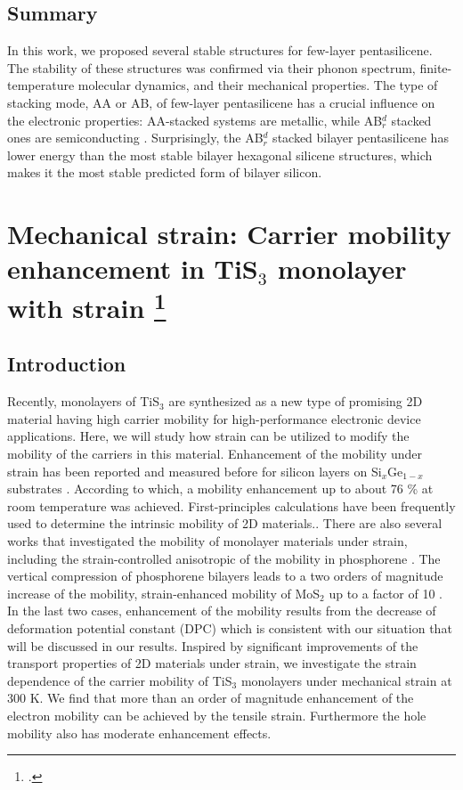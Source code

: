 \subsection{Summary}

In this work, we proposed several stable structures for few-layer pentasilicene. The stability of these structures was confirmed via their phonon spectrum, finite-temperature molecular dynamics, and their mechanical properties. The type of stacking mode, AA or AB, of few-layer pentasilicene has a crucial influence on the electronic properties: AA-stacked systems are metallic, while AB$_r^d$ stacked ones are semiconducting . Surprisingly, the AB$_r^d$ stacked bilayer pentasilicene has lower energy than the most stable bilayer hexagonal silicene structures, which makes it the most stable predicted form of bilayer silicon.  

\section[Mechanical strain: Carrier mobility enhancement in TiS$_3$ monolayer with strain]{Mechanical strain: Carrier mobility enhancement in TiS$_3$ monolayer with strain \footcite[This work is published:][]{Aierken2016.mobility} \label{mob_Tis3}}

\subsection{Introduction}

Recently, monolayers of TiS$_3$\cite{ADOM:ADOM201400043,ADMA:ADMA201405632} are synthesized as a new type of promising 2D material having high carrier mobility for high-performance electronic device applications. Here, we will study how strain can be utilized to modify the mobility of the carriers in this material. Enhancement of the mobility under strain has been reported and measured before for silicon layers on Si$_x$Ge$_{1-x}$ substrates \cite{Vogelsang1993,Welser1994}. According to which, a mobility enhancement up to about 76 \% at room temperature was achieved. First-principles calculations have been frequently used to determine the intrinsic mobility of 2D materials.\cite{Kaasbjerg2012,Zhang2014,Yongqing2014}. There are also several works that investigated the mobility of monolayer materials under strain\cite{fei,Henry2015,Sheng2015}, including the strain-controlled anisotropic of the mobility in phosphorene \cite{fei}. The vertical compression of phosphorene bilayers leads to a two orders of magnitude increase of the mobility\cite{Henry2015}, strain-enhanced mobility of MoS$_2$ up to a factor of 10 \cite{Sheng2015}. In the last two cases, enhancement of the mobility results from the decrease of deformation potential constant (DPC) which is consistent with our situation that will be discussed in our results. Inspired by significant improvements of the transport properties of 2D materials under strain, we investigate the strain dependence of the carrier mobility of TiS$_3$ monolayers under mechanical strain at 300 K. We find that more than an order of magnitude enhancement of the electron mobility can be achieved by the tensile strain. Furthermore the hole mobility also has moderate enhancement effects.


